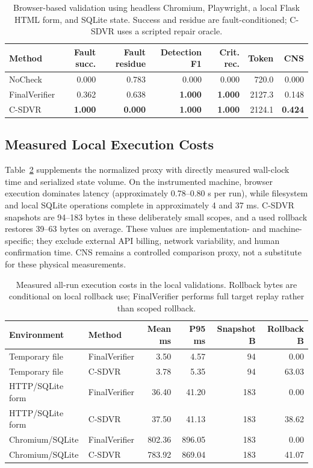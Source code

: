 \documentclass[pdflatex,sn-apa]{sn-jnl}
\begin{document}
\begin{table}[htbp]
\centering
\caption{Browser-based validation using headless Chromium, Playwright, a local Flask HTML form, and SQLite state. Success and residue are fault-conditioned; C-SDVR uses a scripted repair oracle.}
\label{tab:browser}
\small
\begin{tabular}{lrrrrrr}
\toprule
Method & Fault succ. & Fault residue & Detection F1 & Crit. rec. & Token & CNS \\
\midrule
NoCheck & 0.000 & 0.783 & 0.000 & 0.000 & 720.0 & 0.000 \\
FinalVerifier & 0.362 & 0.638 & \textbf{1.000} & \textbf{1.000} & 2127.3 & 0.148 \\
C-SDVR & \textbf{1.000} & \textbf{0.000} & \textbf{1.000} & \textbf{1.000} & 2124.1 & \textbf{0.424} \\
\bottomrule
\end{tabular}
\end{table}

\subsection{Measured Local Execution Costs}

Table~\ref{tab:measured_costs} supplements the normalized proxy with directly measured wall-clock time and serialized state volume. On the instrumented machine, browser execution dominates latency (approximately 0.78--0.80 s per run), while filesystem and local SQLite operations complete in approximately 4 and 37 ms. C-SDVR snapshots are 94--183 bytes in these deliberately small scopes, and a used rollback restores 39--63 bytes on average. These values are implementation- and machine-specific; they exclude external API billing, network variability, and human confirmation time. CNS remains a controlled comparison proxy, not a substitute for these physical measurements.

\begin{table}[htbp]
\centering
\caption{Measured all-run execution costs in the local validations. Rollback bytes are conditional on local rollback use; FinalVerifier performs full target replay rather than scoped rollback.}
\label{tab:measured_costs}
\scriptsize
\setlength{\tabcolsep}{3.2pt}
\begin{tabular}{llrrrr}
\toprule
Environment & Method & Mean ms & P95 ms & Snapshot B & Rollback B \\
\midrule
Temporary file & FinalVerifier & 3.50 & 4.57 & 94 & 0.00 \\
Temporary file & C-SDVR & 3.78 & 5.35 & 94 & 63.03 \\
HTTP/SQLite form & FinalVerifier & 36.40 & 41.20 & 183 & 0.00 \\
HTTP/SQLite form & C-SDVR & 37.50 & 41.13 & 183 & 38.62 \\
Chromium/SQLite & FinalVerifier & 802.36 & 896.05 & 183 & 0.00 \\
Chromium/SQLite & C-SDVR & 783.92 & 869.04 & 183 & 41.07 \\
\bottomrule
\end{tabular}
\end{table}
\end{document}
